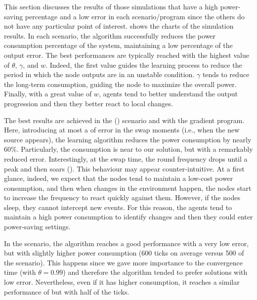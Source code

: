 This section discusses the results of 
 those simulations that have a high power-saving percentage
 and a low error in each scenario/program
 since the others do not have any particular point of interest. 
%
 shows the charts of the simulation results.
%
In each scenario, the algorithm successfully 
 reduces the power consumption percentage of the system, 
 maintaining a low percentage of the output error. 
%
 The best performances are typically reached with the highest value of $\theta$, $\gamma$, and $w$.
%
Indeed, the first value guides the learning process 
 to reduce the period in which the node outputs are in an unstable condition. 
%
$\gamma$ tends to reduce the long-term consumption, 
 guiding the node to maximize the overall power.
% 
Finally, with a great value of $w$, 
 agents tend to better understand the output progression and then they better react to local changes. 

The best results are achieved in the \swapscen{} ()
 scenario and with the gradient program. 
 Here, introducing at most a  of error in the swap moments 
 (i.e., when the new source appears), 
 the learning algorithm reduces the power consumption by nearly 60$\%$.
%
Particularly, the consumption is near to our \adhocsol{} solution, 
 but with a remarkably reduced error. 
%
Interestingly, at the swap time, the round frequency drops until a peak and then soars ().
This behaviour may appear counter-intuitive.
 At a first glance, indeed, we expect that the nodes tend to maintain a low-cost power consumption, 
 and then when changes in the environment happen, 
 the nodes start to increase the frequency to react quickly against them.
%
However, if the nodes sleep, they cannot intercept new events. 
 For this reason, the agents tend to maintain a high power 
 consumption to identify changes and then they could enter power-saving settings.%

In the \multiswap{} scenario, 
 the algorithm reaches a good performance with a very low error, 
 but with slightly higher power consumption (600 ticks on average versus 500 of the \swapscen{} scenario). 
%
This happens since we gave more importance to the convergence time 
 (with $\theta = 0.99$) and therefore the algorithm tended 
 to prefer solutions with low error. %
%
Nevertheless, even if it has higher consumption, 
 it reaches a similar performance of \periodicsol{} but with half of the ticks.
%


